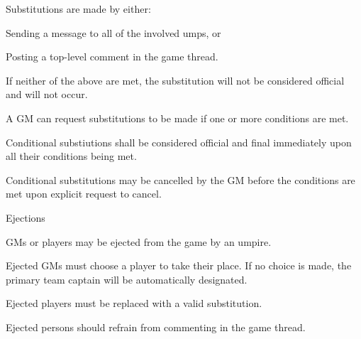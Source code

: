 \begin{deepEnumerate}
\begin{deepEnumerate}
		\begin{deepEnumerate}
			\item Substitutions are made by either:
			\begin{deepEnumerate}
				\item Sending a message to all of the involved umps, or 
				\item Posting a top-level comment in the game thread.
			\end{deepEnumerate}
			\item If neither of the above are met, the substitution will not be considered official and will not occur.
			\item A GM can request substitutions to be made if one or more conditions are met.
			\begin{deepEnumerate}
				\item Conditional substiutions shall be considered official and final immediately upon all their conditions being met. 
				\item Conditional substitutions may be cancelled by the GM before the conditions are met upon explicit request to cancel.
			\end{deepEnumerate}
		\end{deepEnumerate}
	\end{deepEnumerate}
	\item Ejections
	\begin{deepEnumerate}
		\item GMs or players may be ejected from the game by an umpire.
		\begin{deepEnumerate}
			\item Ejected GMs must choose a player to take their place. If no choice is made, the primary team captain will be automatically designated.
			\item Ejected players must be replaced with a valid substitution.
			\item Ejected persons should refrain from commenting in the game thread.
		\end{deepEnumerate}
	\end{deepEnumerate}
\end{deepEnumerate}

